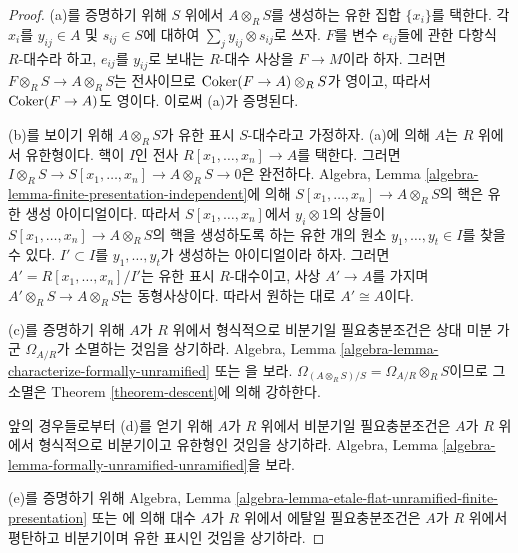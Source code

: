\begin{proof}
(a)를 증명하기 위해 $S$ 위에서 $A \otimes_R S$를 생성하는 유한 집합
$\{x_i\}$를 택한다. 각 $x_i$를 $y_{ij} \in A$ 및 $s_{ij} \in S$에
대하여 $\sum_j y_{ij} \otimes s_{ij}$로 쓰자. $F$를 변수 $e_{ij}$들에
관한 다항식 $R$-대수라 하고, $e_{ij}$를 $y_{ij}$로 보내는 $R$-대수
사상을 $F \to M$이라 하자. 그러면
$F \otimes_R S\to A \otimes_R S$는 전사이므로
$\mathop{\mathrm{Coker}}(F \to A) \otimes_R S$가 영이고, 따라서 $\mathop{\mathrm{Coker}}(F \to A)$도
영이다. 이로써 (a)가 증명된다.

\medskip\noindent
(b)를 보이기 위해 $A \otimes_R S$가 유한 표시 $S$-대수라고 가정하자.
(a)에 의해 $A$는 $R$ 위에서 유한형이다. 핵이 $I$인 전사
$R[x_1, \ldots, x_n] \to A$를 택한다. 그러면
$I \otimes_R S \to S[x_1, \ldots, x_n] \to A \otimes_R S \to 0$은
완전하다. Algebra, Lemma
\ref{algebra-lemma-finite-presentation-independent}에 의해
$S[x_1, \ldots, x_n] \to A \otimes_R S$의 핵은 유한 생성 아이디얼이다.
따라서 $S[x_1, \ldots, x_n]$에서 $y_i \otimes 1$의 상들이
$S[x_1, \ldots, x_n] \to A \otimes_R S$의 핵을 생성하도록 하는 유한
개의 원소 $y_1, \ldots, y_t \in I$를 찾을 수 있다.
$I' \subset I$를 $y_1, \ldots, y_t$가 생성하는 아이디얼이라 하자. 그러면
$A' = R[x_1, \ldots, x_n]/I'$는 유한 표시 $R$-대수이고, 사상
$A' \to A$를 가지며 $A' \otimes_R S \to A \otimes_R S$는 동형사상이다.
따라서 원하는 대로 $A' \cong A$이다.

\medskip\noindent
(c)를 증명하기 위해 $A$가 $R$ 위에서 형식적으로 비분기일 필요충분조건은
상대 미분 가군 $\Omega_{A/R}$가 소멸하는 것임을 상기하라. Algebra, Lemma
\ref{algebra-lemma-characterize-formally-unramified} 또는
\cite[Proposition~17.2.1]{EGA4}을 보라.
$\Omega_{(A \otimes_R S)/S} = \Omega_{A/R} \otimes_R S$이므로 그 소멸은
Theorem \ref{theorem-descent}에 의해 강하한다.

\medskip\noindent
앞의 경우들로부터 (d)를 얻기 위해 $A$가 $R$ 위에서 비분기일
필요충분조건은 $A$가 $R$ 위에서 형식적으로 비분기이고 유한형인 것임을
상기하라. Algebra, Lemma
\ref{algebra-lemma-formally-unramified-unramified}을 보라.

\medskip\noindent
(e)를 증명하기 위해 Algebra, Lemma
\ref{algebra-lemma-etale-flat-unramified-finite-presentation} 또는
\cite[Th\'eor\`eme~17.6.1]{EGA4}에 의해 대수 $A$가 $R$ 위에서 에탈일
필요충분조건은 $A$가 $R$ 위에서 평탄하고 비분기이며 유한 표시인 것임을
상기하라.
\end{proof}

